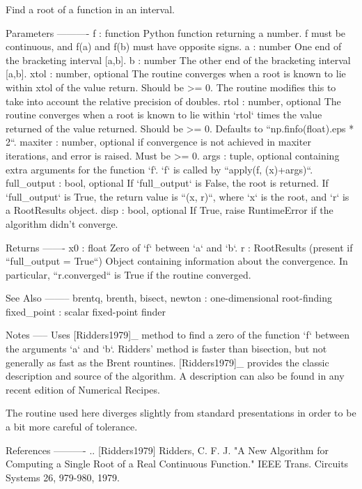 \begin{DoxyVerb}Find a root of a function in an interval.

Parameters
----------
f : function
    Python function returning a number.  f must be continuous, and f(a) and
    f(b) must have opposite signs.
a : number
    One end of the bracketing interval [a,b].
b : number
    The other end of the bracketing interval [a,b].
xtol : number, optional
    The routine converges when a root is known to lie within xtol of the
    value return. Should be >= 0.  The routine modifies this to take into
    account the relative precision of doubles.
rtol : number, optional
    The routine converges when a root is known to lie within `rtol` times
    the value returned of the value returned. Should be >= 0. Defaults to
    ``np.finfo(float).eps * 2``.
maxiter : number, optional
    if convergence is not achieved in maxiter iterations, and error is
    raised.  Must be >= 0.
args : tuple, optional
    containing extra arguments for the function `f`.
    `f` is called by ``apply(f, (x)+args)``.
full_output : bool, optional
    If `full_output` is False, the root is returned.  If `full_output` is
    True, the return value is ``(x, r)``, where `x` is the root, and `r` is
    a RootResults object.
disp : bool, optional
    If True, raise RuntimeError if the algorithm didn't converge.

Returns
-------
x0 : float
    Zero of `f` between `a` and `b`.
r : RootResults (present if ``full_output = True``)
    Object containing information about the convergence.
    In particular, ``r.converged`` is True if the routine converged.

See Also
--------
brentq, brenth, bisect, newton : one-dimensional root-finding
fixed_point : scalar fixed-point finder

Notes
-----
Uses [Ridders1979]_ method to find a zero of the function `f` between the
arguments `a` and `b`. Ridders' method is faster than bisection, but not
generally as fast as the Brent rountines. [Ridders1979]_ provides the
classic description and source of the algorithm. A description can also be
found in any recent edition of Numerical Recipes.

The routine used here diverges slightly from standard presentations in
order to be a bit more careful of tolerance.

References
----------
.. [Ridders1979]
   Ridders, C. F. J. "A New Algorithm for Computing a
   Single Root of a Real Continuous Function."
   IEEE Trans. Circuits Systems 26, 979-980, 1979.\end{DoxyVerb}
 


